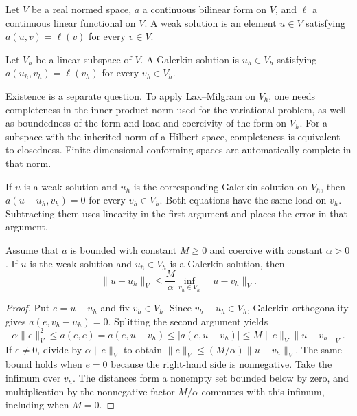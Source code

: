 \begin{definition}
  \label{def:weak-solution}
  Let $V$ be a real normed space, $a$ a continuous bilinear form on $V$, and
  $\ell$ a continuous linear functional on $V$. A weak solution is an element
  $u\in V$ satisfying $a(u,v)=\ell(v)$ for every $v\in V$.
\end{definition}

\begin{definition}
  \label{def:galerkin-solution}
  Let $V_h$ be a linear subspace of $V$. A Galerkin solution is $u_h\in V_h$
  satisfying $a(u_h,v_h)=\ell(v_h)$ for every $v_h\in V_h$.
\end{definition}

Existence is a separate question. To apply Lax--Milgram on $V_h$, one needs
completeness in the inner-product norm used for the variational problem,
as well as boundedness of the form and load and coercivity of the form on $V_h$.
For a subspace with the inherited norm of a Hilbert space, completeness is
equivalent to closedness. Finite-dimensional conforming spaces are automatically
complete in that norm.

\begin{lemma}
  \label{lem:galerkin-orthogonality}
  If $u$ is a weak solution and $u_h$ is the corresponding Galerkin solution on
  $V_h$, then $a(u-u_h,v_h)=0$ for every $v_h\in V_h$.
  Both equations have the same load on $v_h$. Subtracting them uses
  linearity in the first argument and places the error in that argument.
\end{lemma}

\begin{theorem}
  \label{thm:cea}
  Assume that $a$ is bounded with constant $M\ge 0$ and coercive with constant
  $\alpha>0$. If $u$ is the weak solution and $u_h\in V_h$ is a Galerkin
  solution, then
  \[
    \|u-u_h\|_V\le \frac{M}{\alpha}
      \inf_{v_h\in V_h}\|u-v_h\|_V.
  \]
\end{theorem}
\begin{proof}
  Put $e=u-u_h$ and fix $v_h\in V_h$. Since $v_h-u_h\in V_h$, Galerkin
  orthogonality gives $a(e,v_h-u_h)=0$. Splitting the second argument yields
  \[
    \alpha\|e\|_V^2 \le a(e,e)=a(e,u-v_h)
       \le |a(e,u-v_h)|\le M\|e\|_V\|u-v_h\|_V .
  \]
  If $e\ne 0$, divide by $\alpha\|e\|_V$ to obtain
  $\|e\|_V\le(M/\alpha)\|u-v_h\|_V$. The same bound holds when $e=0$
  because the right-hand side is nonnegative. Take the infimum over $v_h$.
  The distances form a nonempty set bounded below by zero, and multiplication
  by the nonnegative factor $M/\alpha$ commutes with this infimum, including
  when $M=0$.
\end{proof}

